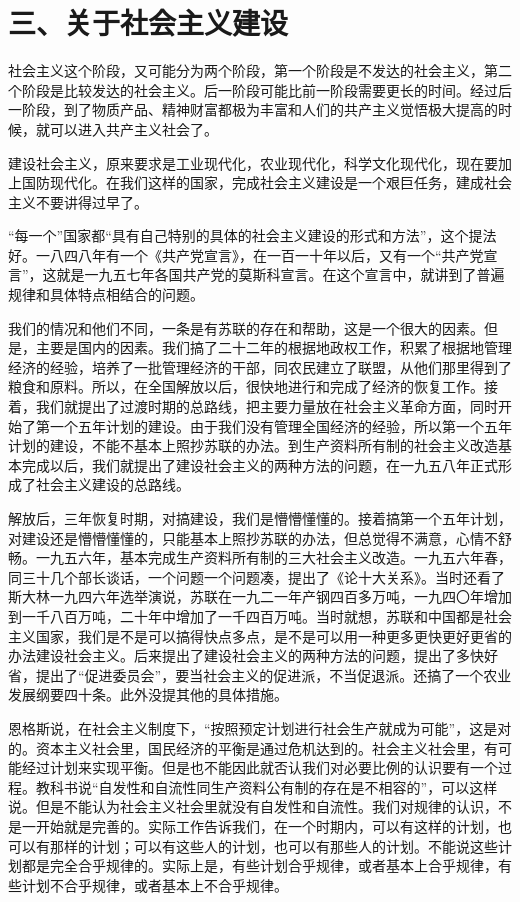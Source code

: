 \section{三、关于社会主义建设}

社会主义这个阶段，又可能分为两个阶段，第一个阶段是不发达的社会主义，第二个阶段是比较发达的社会主义。后一阶段可能比前一阶段需要更长的时间。经过后一阶段，到了物质产品、精神财富都极为丰富和人们的共产主义觉悟极大提高的时候，就可以进入共产主义社会了。

建设社会主义，原来要求是工业现代化，农业现代化，科学文化现代化，现在要加上国防现代化。在我们这样的国家，完成社会主义建设是一个艰巨任务，建成社会主义不要讲得过早了。

“每一个”国家都“具有自己特别的具体的社会主义建设的形式和方法”，这个提法好。一八四八年有一个《共产党宣言》，在一百一十年以后，又有一个“共产党宣言”，这就是一九五七年各国共产党的莫斯科宣言。在这个宣言中，就讲到了普遍规律和具体特点相结合的问题。

我们的情况和他们不同，一条是有苏联的存在和帮助，这是一个很大的因素。但是，主要是国内的因素。我们搞了二十二年的根据地政权工作，积累了根据地管理经济的经验，培养了一批管理经济的干部，同农民建立了联盟，从他们那里得到了粮食和原料。所以，在全国解放以后，很快地进行和完成了经济的恢复工作。接着，我们就提出了过渡时期的总路线，把主要力量放在社会主义革命方面，同时开始了第一个五年计划的建设。由于我们没有管理全国经济的经验，所以第一个五年计划的建设，不能不基本上照抄苏联的办法。到生产资料所有制的社会主义改造基本完成以后，我们就提出了建设社会主义的两种方法的问题，在一九五八年正式形成了社会主义建设的总路线。

解放后，三年恢复时期，对搞建设，我们是懵懵懂懂的。接着搞第一个五年计划，对建设还是懵懵懂懂的，只能基本上照抄苏联的办法，但总觉得不满意，心情不舒畅。一九五六年，基本完成生产资料所有制的三大社会主义改造。一九五六年春，同三十几个部长谈话，一个问题一个问题凑，提出了《论十大关系》。当时还看了斯大林一九四六年选举演说，苏联在一九二一年产钢四百多万吨，一九四〇年增加到一千八百万吨，二十年中增加了一千四百万吨。当时就想，苏联和中国都是社会主义国家，我们是不是可以搞得快点多点，是不是可以用一种更多更快更好更省的办法建设社会主义。后来提出了建设社会主义的两种方法的问题，提出了多快好省，提出了“促进委员会”，要当社会主义的促进派，不当促退派。还搞了一个农业发展纲要四十条。此外没提其他的具体措施。

恩格斯说，在社会主义制度下，“按照预定计划进行社会生产就成为可能”，这是对的。资本主义社会里，国民经济的平衡是通过危机达到的。社会主义社会里，有可能经过计划来实现平衡。但是也不能因此就否认我们对必要比例的认识要有一个过程。教科书说“自发性和自流性同生产资料公有制的存在是不相容的”，可以这样说。但是不能认为社会主义社会里就没有自发性和自流性。我们对规律的认识，不是一开始就是完善的。实际工作告诉我们，在一个时期内，可以有这样的计划，也可以有那样的计划；可以有这些人的计划，也可以有那些人的计划。不能说这些计划都是完全合乎规律的。实际上是，有些计划合乎规律，或者基本上合乎规律，有些计划不合乎规律，或者基本上不合乎规律。

